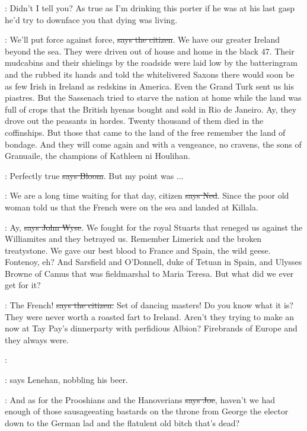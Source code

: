 \Nq:
Didn't I tell you? As true as I'm drinking this porter if he was at his
last gasp he'd try to downface you that dying was living.

\citizen:
We'll put force against force, \sout{says the citizen}.
We have our greater
Ireland beyond the sea. They were driven out of house and home in the
black 47. Their mudcabins and their shielings by the roadside were laid
low by the batteringram and the  rubbed its hands and told the
whitelivered Saxons there would soon be as few Irish in Ireland as
redskins in America. Even the Grand Turk sent us his piastres. But the
Sassenach tried to starve the nation at home
while the land was full of
crops that the British hyenas bought and sold in Rio de Janeiro. Ay, they
drove out the peasants in hordes. Twenty thousand of them died in the
coffinships. But those that came to the land of the free remember the
land of bondage. And they will come again and with a vengeance, no
cravens, the sons of Granuaile, the champions of Kathleen ni Houlihan.

\Bloom:
Perfectly true \sout{says Bloom}.
But my point was ...

\lambert:
We are a long time waiting for that day,
citizen \sout{says Ned}. Since the
poor old woman told us that the French were on the sea and landed at
Killala.

\johnwyse:
Ay, \sout{says John Wyse}.
We fought for the royal Stuarts that reneged us
against the Williamites and they betrayed us.
Remember Limerick and the
broken treatystone. We gave our best blood to France and Spain, the wild
geese. Fontenoy, eh? And Sarsfield and O'Donnell, duke of Tetuan in
Spain, and Ulysses Browne of Camus that was fieldmarshal to Maria Teresa.
But what did we ever get for it?

\citizen:
The French! \sout{says the citizen.}
Set of dancing masters! Do you know what
it is? They were never worth a roasted fart to Ireland. Aren't they
trying to make an  now at Tay Pay's dinnerparty with
perfidious Albion? Firebrands of Europe and they always were.

\lenehan:

\Nq:
says Lenehan, nobbling his beer.

\joe:
And as for the Prooshians and the Hanoverians
\sout{says Joe}, haven't we had
enough of those sausageeating bastards on the throne from George the
elector down to the German lad and the flatulent old bitch that's dead?

